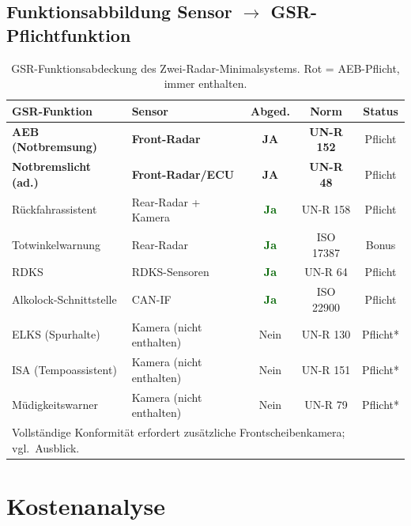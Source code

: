 ﻿\documentclass[a4paper,12pt]{article}
\theoremstyle{definition}
\begin{document}
\subsection{Funktionsabbildung Sensor $\to$ GSR-Pflichtfunktion}

\begin{table}[H]
\centering
\caption{GSR-Funktionsabdeckung des Zwei-Radar-Minimalsystems.
\textcolor{accentred}{Rot} = AEB-Pflicht, immer enthalten.}
\label{tab:abdeckung}
\renewcommand{\arraystretch}{1.35}
\begin{tabular}{@{}llccc@{}}
\toprule
\textbf{GSR-Funktion} & \textbf{Sensor} & \textbf{Abged.}
  & \textbf{Norm} & \textbf{Status}\\
\midrule
\rowcolor{lightred}
\textbf{AEB (Notbremsung)} & \textbf{Front-Radar}
  & \textcolor{accentred}{\textbf{JA}}
  & \textbf{UN-R 152}
  & \textcolor{accentred}{Pflicht} \\
\rowcolor{lightred}
\textbf{Notbremslicht (ad.)} & \textbf{Front-Radar/ECU}
  & \textcolor{accentred}{\textbf{JA}}
  & \textbf{UN-R 48}
  & \textcolor{accentred}{Pflicht} \\
R\"uckfahrassistent  & Rear-Radar + Kamera
  & \textcolor{darkgreen}{\textbf{Ja}} & UN-R 158 & Pflicht\\
Totwinkelwarnung & Rear-Radar
  & \textcolor{darkgreen}{\textbf{Ja}} & ISO 17387 & Bonus\\
RDKS & RDKS-Sensoren
  & \textcolor{darkgreen}{\textbf{Ja}} & UN-R 64 & Pflicht\\
Alkolock-Schnittstelle & CAN-IF
  & \textcolor{darkgreen}{\textbf{Ja}} & ISO 22900 & Pflicht\\
\midrule
ELKS (Spurhalte) & Kamera (nicht enthalten)
  & \textcolor{accentred}{Nein} & UN-R 130 & Pflicht*\\
ISA (Tempoassistent) & Kamera (nicht enthalten)
  & \textcolor{accentred}{Nein} & UN-R 151 & Pflicht*\\
M\"udigkeitswarner & Kamera (nicht enthalten)
  & \textcolor{accentred}{Nein} & UN-R 79 & Pflicht*\\
\bottomrule
\multicolumn{5}{l}{\small * Vollst\"andige Konformit\"at erfordert zus\"atzliche Frontscheibenkamera; vgl.\ Ausblick.}
\end{tabular}
\end{table}

\section{Kostenanalyse}
\label{sec:kosten}
\end{document}
